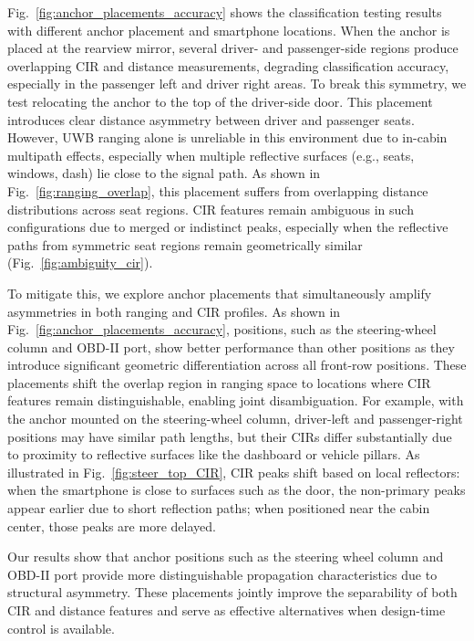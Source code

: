 \documentclass[sigconf]{acmart}
\begin{document}
Fig.~\ref{fig:anchor_placements_accuracy} shows the classification testing 
results with different anchor placement and smartphone locations.
%
When the anchor is placed at the rearview mirror, several driver- and 
passenger-side regions produce overlapping CIR and distance measurements, 
degrading classification accuracy, especially in the passenger left and driver 
right areas. 
%
To break this symmetry, we test relocating the anchor to the top of the
driver-side door. This placement introduces clear distance asymmetry between 
driver and passenger seats.
%
However, UWB ranging alone is unreliable in this environment due to in-cabin 
multipath effects, especially when multiple reflective surfaces (e.g., seats, 
windows, dash) lie close to the signal path. 
%
As shown in Fig.~\ref{fig:ranging_overlap}, this placement suffers from 
overlapping distance distributions across seat regions.
%
CIR features remain ambiguous in such configurations due to merged or
indistinct peaks, especially when the reflective paths from symmetric seat
regions remain geometrically similar (Fig.~\ref{fig:ambiguity_cir}).



To mitigate this, we explore anchor placements that simultaneously amplify 
asymmetries in both ranging and CIR profiles.
%
As shown in Fig.~\ref{fig:anchor_placements_accuracy}, positions, such as
the steering-wheel column and OBD-II port, show better performance than other positions as they introduce significant geometric 
differentiation across all front-row positions.
%
These placements shift the overlap region in ranging space to locations where 
CIR features remain distinguishable, enabling joint disambiguation.
%
For example, with the anchor mounted on the steering-wheel column, driver-left 
and passenger-right positions may have similar path lengths, but their CIRs differ 
substantially due to proximity to reflective surfaces like the dashboard 
or vehicle pillars.
%
As illustrated in Fig.~\ref{fig:steer_top_CIR}, CIR peaks shift based on local 
reflectors: when the smartphone is close to surfaces such as the door, 
the non-primary peaks appear earlier due to short 
reflection paths; when positioned near the cabin center, those peaks are
more delayed.

Our results show that anchor positions such as the steering wheel column and
OBD-II port provide more distinguishable propagation characteristics due to 
structural asymmetry. 
%
These placements jointly improve the separability of both CIR and distance 
features and serve as effective alternatives when design-time control is available.
\end{document}
